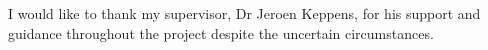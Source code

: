 I would like to thank my supervisor, Dr Jeroen Keppens, for his support and guidance throughout the project despite the uncertain circumstances.